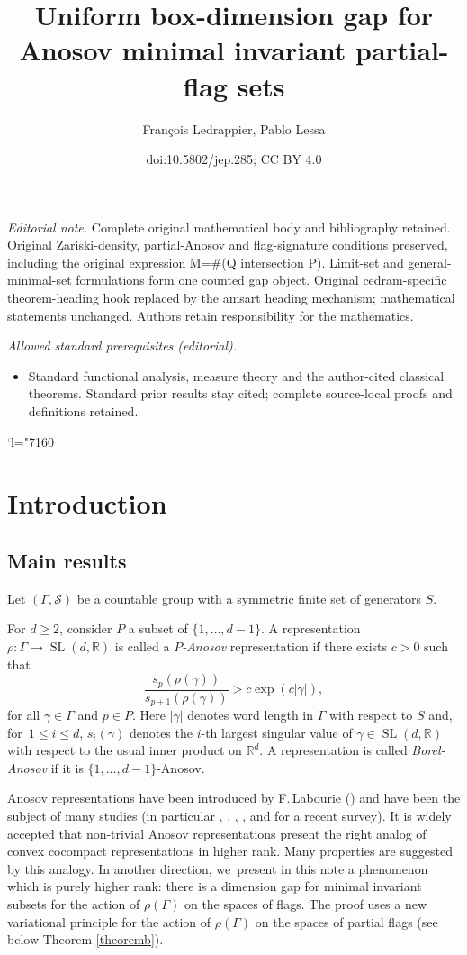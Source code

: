 \documentclass[10pt]{amsart}
\title{Uniform box-dimension gap for Anosov minimal invariant partial-flag sets}
\author{François Ledrappier, Pablo Lessa}
\date{doi:10.5802/jep.285; CC BY 4.0}
\newcommand{\Changel}{\mathcode`l="7160}
\newcommand{\R}{\mathbb{R}}
\newcommand{\cS}{\mathcal{S}}
\let\G\Gamma
\let\g\gamma
\DeclareMathOperator{\SL}{SL}
\providecommand{\mainmatter}{}\providecommand{\backmatter}{}
\begin{document}
\maketitle
\noindent\textit{Editorial note.} Complete original mathematical body and bibliography retained. Original Zariski-density, partial-Anosov and flag-signature conditions preserved, including the original expression M=\#(Q intersection P). Limit-set and general-minimal-set formulations form one counted gap object. Original cedram-specific theorem-heading hook replaced by the amsart heading mechanism; mathematical statements unchanged. Authors retain responsibility for the mathematics.\par\medskip
\noindent\textit{Allowed standard prerequisites (editorial).}\begin{itemize}
\item Standard functional analysis, measure theory and the author-cited classical theorems. Standard prior results stay cited; complete source-local proofs and definitions retained.
\end{itemize}\medskip
\vspace*{-\baselineskip}
\tableofcontents
\mainmatter

\Changel

\section{Introduction}

\subsection{Main results}

Let \((\Gamma,\cS)\) be a countable group with a symmetric finite set of generators \(S\).

For \(d \ge 2\), consider \(P\) a subset of \(\lbrace 1,\ldots, d-1\rbrace\).
A representation \(\rho: \Gamma \to \SL(d,\R)\)
is called a {\it{\(P\)-Anosov}} representation if there exists \(c > 0\) such that
\[
\frac{s_{p}(\rho(\gamma))}{s_{p+1}(\rho(\gamma))} > c\exp(c|\gamma|),
\]
for all \(\gamma \in \Gamma\) and \(p \in P\). Here \(|\gamma|\) denotes word length in \(\Gamma\) with respect to \(S\) and, for~\(1\le i\le d, \, s_i(\g)\) denotes the \(i\)-th largest singular value of \(\g \in \SL(d,\R)\) with respect to the usual inner product on \(\R^d\). A representation is called {\it{Borel-Anosov}} if it is \(\lbrace 1,\ldots, d-1\rbrace\)-Anosov.

Anosov representations have been introduced by F.\,Labourie (\cite{Lab06}) and have been the subject of many studies (\cf in particular \cite{GGKW17}, \cite {KLP16}, \cite{KLP17}, \cite{KLP18a}, \cite{BPS19} and \cite{canary} for a recent survey). It is widely accepted that non-trivial Anosov representations present the right analog of convex cocompact representations in higher rank. Many properties are suggested by this analogy. In another direction, we~present in this note a phenomenon which is purely higher rank: there is a dimension gap for minimal invariant subsets for the action of \(\rho (\G) \) on the spaces of flags. The proof uses a new variational principle for the action of \(\rho (\G) \) on the spaces of partial flags (see below Theorem \ref{theoremb}).
\end{document}
